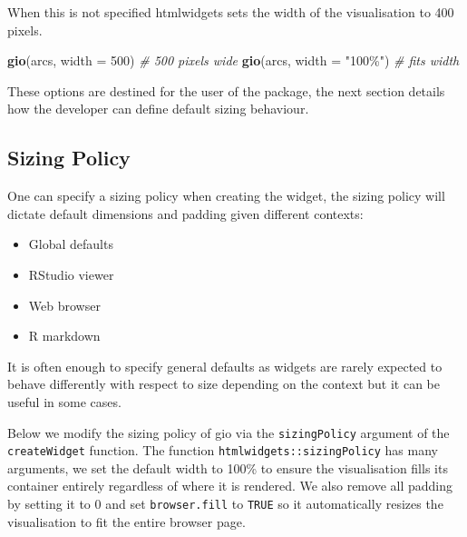 \documentclass[
]{krantz}
\makeatletter
\newenvironment{Shaded}{\begin{snugshade}}{\end{snugshade}}
\newcommand{\CommentTok}[1]{\textcolor[rgb]{0.37,0.37,0.37}{\textit{#1}}}
\newcommand{\DataTypeTok}[1]{\textcolor[rgb]{0.27,0.27,0.27}{#1}}
\newcommand{\DecValTok}[1]{\textcolor[rgb]{0.06,0.06,0.06}{#1}}
\newcommand{\KeywordTok}[1]{\textcolor[rgb]{0.27,0.27,0.27}{\textbf{#1}}}
\newcommand{\NormalTok}[1]{#1}
\newcommand{\StringTok}[1]{\textcolor[rgb]{0.5,0.5,0.5}{#1}}
\providecommand{\tightlist}{%
  \setlength{\itemsep}{0pt}\setlength{\parskip}{0pt}}
\newenvironment{kframe}{%
\medskip{}
\setlength{\fboxsep}{.8em}
 \def\at@end@of@kframe{}%
 \ifinner\ifhmode%
  \def\at@end@of@kframe{\end{minipage}}%
  \begin{minipage}{\columnwidth}%
 \fi\fi%
 \def\FrameCommand##1{\hskip\@totalleftmargin \hskip-\fboxsep
 \colorbox{shadecolor}{##1}\hskip-\fboxsep
     \hskip-\linewidth \hskip-\@totalleftmargin \hskip\columnwidth}%
 \MakeFramed {\advance\hsize-\width
   \@totalleftmargin\z@ \linewidth\hsize
   \@setminipage}}%
 {\par\unskip\endMakeFramed%
 \at@end@of@kframe}
\renewenvironment{Shaded}{\begin{kframe}}{\end{kframe}}
\makeatother
\begin{document}
When this is not specified htmlwidgets sets the width of the visualisation to 400 pixels.

\begin{Shaded}
\begin{Highlighting}[]
\KeywordTok{gio}\NormalTok{(arcs, }\DataTypeTok{width =} \DecValTok{500}\NormalTok{) }\CommentTok{\# 500 pixels wide}
\KeywordTok{gio}\NormalTok{(arcs, }\DataTypeTok{width =} \StringTok{"100\%"}\NormalTok{) }\CommentTok{\# fits width}
\end{Highlighting}
\end{Shaded}

These options are destined for the user of the package, the next section details how the developer can define default sizing behaviour.

\hypertarget{sizing-policy}{%
\subsection{Sizing Policy}\label{sizing-policy}}

One can specify a sizing policy when creating the widget, the sizing policy will dictate default dimensions and padding given different contexts:

\begin{itemize}
\tightlist
\item
  Global defaults
\item
  RStudio viewer
\item
  Web browser
\item
  R markdown
\end{itemize}

It is often enough to specify general defaults as widgets are rarely expected to behave differently with respect to size depending on the context but it can be useful in some cases.

Below we modify the sizing policy of gio via the \texttt{sizingPolicy} argument of the \texttt{createWidget} function. The function \texttt{htmlwidgets::sizingPolicy} has many arguments, we set the default width to 100\% to ensure the visualisation fills its container entirely regardless of where it is rendered. We also remove all padding by setting it to 0 and set \texttt{browser.fill} to \texttt{TRUE} so it automatically resizes the visualisation to fit the entire browser page.
\end{document}
